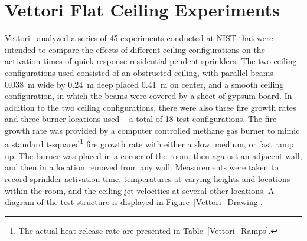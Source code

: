\section{Vettori Flat Ceiling Experiments}
\label{Vettori_Flat_Ceiling_Description}

Vettori~\cite{Vettori:1} analyzed a series of 45 experiments conducted at NIST that were intended to compare the effects of different ceiling configurations on the activation times of quick response residential pendent sprinklers. The two ceiling configurations used consisted of an obstructed ceiling, with parallel beams 0.038~m wide by 0.24~m deep placed 0.41~m on center, and a smooth ceiling configuration, in which the beams were covered by a sheet of gypsum board.  In addition to the two ceiling configurations, there were also three fire growth rates and three burner locations used -- a total of 18 test configurations. The fire growth rate was provided by a computer controlled methane gas burner to mimic a standard t-squared\footnote{The actual heat release rate are presented in Table~\ref{Vettori_Ramps}.} fire growth rate with either a slow, medium, or fast ramp up. The burner was placed in a corner of the room, then against an adjacent wall, and then in a location removed from any wall. Measurements were taken to record sprinkler activation time, temperatures at varying heights and locations within the room, and the ceiling jet velocities at several other locations.  A diagram of the test structure is displayed in Figure~\ref{Vettori_Drawing}.

